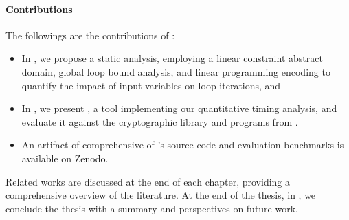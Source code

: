 \paragraph{Contributions}

The followings are the contributions of :

\begin{itemize}
  \item In , we propose a static analysis, employing a linear constraint abstract domain, global loop bound analysis, and linear programming encoding to quantify the impact of input variables on loop iterations, and
  \item In , we present \timesec\sidenote{\timesecurl}, a tool implementing our quantitative timing analysis, and evaluate it against the \bignum{} cryptographic library\sidenote{\bignumurl} and programs from \svcomp \sidenote{\svcompurl}.
  \item An artifact of \timesec{} comprehensive of \timesec's source code and evaluation benchmarks is available on Zenodo\sidenote{\timeseczenodo}.
\end{itemize}

\frenchdiv

Related works are discussed at the end of each chapter, providing a comprehensive overview of the literature.
At the end of the thesis, in , we conclude the thesis with a summary and perspectives on future work.
